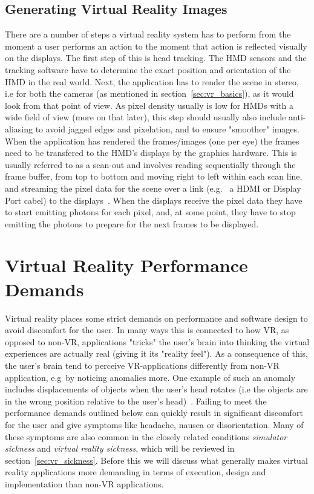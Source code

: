 \subsection*{Generating Virtual Reality Images}
There are a number of steps a virtual reality system has to perform from the moment a user performs an action to the moment that action is reflected visually on the displays.
The first step of this is head tracking. The HMD sensors and the tracking software have to determine the exact position and orientation of the HMD in the 
real world. Next, the application has to render the scene in stereo, i.e for both the cameras (as mentioned in section~\vref{sec:vr_basics}), 
as it would look from that point of view. As pixel density usually is low for HMDs with a wide field of view (more on that later), this step should usually 
also include anti-aliasing to avoid jagged edges and pixelation, and to ensure "smoother" images. When the application has rendered the frames/images (one per eye)
the frames need to be transfered to the HMD's displays by the graphics hardware. This is usually referred to as a scan-out and involves reading sequentially through the 
frame buffer, from top to bottom and moving right to left within each scan line, and streaming the pixel data for the scene over a link (e.g.~ a HDMI or Display Port cabel) 
to the displays~\citep{Abrash2012}. When the displays receive the pixel data they have to start emitting photons for each pixel, and, at some point, they 
have to stop emitting the photons to prepare for the next frames to be displayed. 


\section{Virtual Reality Performance Demands}
Virtual reality places some strict demands on performance and software design to avoid discomfort for the user. In many ways this is connected to how VR, 
as opposed to non-VR, applications "tricks" the user's brain into thinking the virtual experiences are actually real (giving it its "reality feel"). 
As a consequence of this, the user's brain tend to perceive VR-applications differently from non-VR application, e.g~by noticing anomalies more. 
One example of such an anomaly includes displacements of objects when the user's head rotates (i.e the objects are in the wrong position 
relative to the user's head)~\citep{Abrash2012}. 
Failing to meet the performance demands outlined below can quickly result in significant discomfort for the user and give symptoms like 
headache, nausea or disorientation. Many of these symptoms are also common in the closely related conditions \textit{simulator sickness} and \textit{virtual reality sickness},
which will be reviewed in section~\vref{sec:vr_sickness}.  
Before this we will discuss what generally makes virtual reality applications more demanding in terms of execution, design and implementation than non-VR applications.


